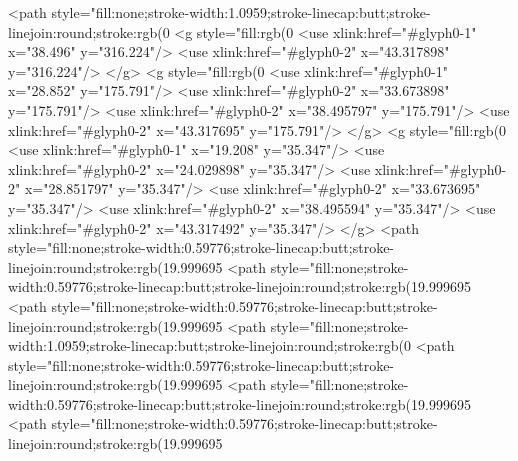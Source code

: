 <path style="fill:none;stroke-width:1.0959;stroke-linecap:butt;stroke-linejoin:round;stroke:rgb(0%
<g style="fill:rgb(0%
  <use xlink:href="#glyph0-1" x="38.496" y="316.224"/>
  <use xlink:href="#glyph0-2" x="43.317898" y="316.224"/>
</g>
<g style="fill:rgb(0%
  <use xlink:href="#glyph0-1" x="28.852" y="175.791"/>
  <use xlink:href="#glyph0-2" x="33.673898" y="175.791"/>
  <use xlink:href="#glyph0-2" x="38.495797" y="175.791"/>
  <use xlink:href="#glyph0-2" x="43.317695" y="175.791"/>
</g>
<g style="fill:rgb(0%
  <use xlink:href="#glyph0-1" x="19.208" y="35.347"/>
  <use xlink:href="#glyph0-2" x="24.029898" y="35.347"/>
  <use xlink:href="#glyph0-2" x="28.851797" y="35.347"/>
  <use xlink:href="#glyph0-2" x="33.673695" y="35.347"/>
  <use xlink:href="#glyph0-2" x="38.495594" y="35.347"/>
  <use xlink:href="#glyph0-2" x="43.317492" y="35.347"/>
</g>
<path style="fill:none;stroke-width:0.59776;stroke-linecap:butt;stroke-linejoin:round;stroke:rgb(19.999695%
<path style="fill:none;stroke-width:0.59776;stroke-linecap:butt;stroke-linejoin:round;stroke:rgb(19.999695%
<path style="fill:none;stroke-width:0.59776;stroke-linecap:butt;stroke-linejoin:round;stroke:rgb(19.999695%
<path style="fill:none;stroke-width:1.0959;stroke-linecap:butt;stroke-linejoin:round;stroke:rgb(0%
<path style="fill:none;stroke-width:0.59776;stroke-linecap:butt;stroke-linejoin:round;stroke:rgb(19.999695%
<path style="fill:none;stroke-width:0.59776;stroke-linecap:butt;stroke-linejoin:round;stroke:rgb(19.999695%
<path style="fill:none;stroke-width:0.59776;stroke-linecap:butt;stroke-linejoin:round;stroke:rgb(19.999695%
